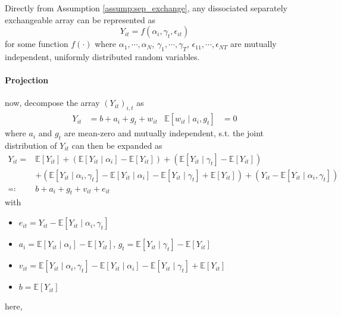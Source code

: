 \documentclass[twoside]{article}
\begin{document}
Directly from Assumption \ref{assump:sep_exchange}, any dissociated separately exchangeable array can be represented as 
\begin{equation*}
    Y_{it} = f\left(\alpha_i,\gamma_t,\epsilon_{it}\right)
\end{equation*}
for some function $f(\cdot)$ where $\alpha_1,\cdots,\alpha_N$, $\gamma_1,\cdots,\gamma_T$, $\epsilon_{11},\cdots,\epsilon_{NT}$ are mutually independent, uniformly distributed random variables.

\paragraph*{Projection} now, decompose the array $\left(Y_{it}\right)_{i,t}$ as 
\begin{align*}
    Y_{it} &= b + a_i + g_t + w_{it} & \mathbb{E}\left[w_{it}\mid a_i,g_t\right]&=0
\end{align*}
where $a_i$ and $g_t$ are mean-zero and mutually independent, s.t. the joint distribution of $Y_{it}$ can then be expanded as 
\begin{align*}
    Y_{it} =& \mathbb{E}\left[Y_{it}\right] + \left(\mathbb{E}\left[Y_{it}\mid \alpha_i\right] - \mathbb{E}\left[Y_{it}\right] \right) + \left( \mathbb{E}\left[Y_{it}\mid \gamma_t\right] - \mathbb{E}\left[Y_{it}\right] \right) \\
    &+ \left( \mathbb{E}\left[Y_{it}\mid \alpha_i,\gamma_t\right] - \mathbb{E}\left[Y_{it}\mid \alpha_i\right] - \mathbb{E}\left[Y_{it}\mid \gamma_t\right] + \mathbb{E}\left[Y_{it}\right]\right) + \left( Y_{it}-\mathbb{E}\left[Y_{it}\mid \alpha_i,\gamma_t\right] \right) \\
    \eqcolon & b+ a_i + g_t + v_{it} + e_{it}
\end{align*}
with
\begin{itemize}
    \item $e_{it} = Y_{it} - \mathbb{E}\left[Y_{it}\mid \alpha_i,\gamma_t\right]$
    \item $a_i = \mathbb{E}\left[Y_{it}\mid\alpha_i \right]-\mathbb{E}\left[Y_{it}\right]$, $g_t= \mathbb{E}\left[Y_{it}\mid \gamma_t\right]-\mathbb{E}\left[Y_{it}\right]$
    \item $v_{it} = \mathbb{E}\left[Y_{it}\mid \alpha_i,\gamma_t\right] - \mathbb{E}\left[Y_{it}\mid \alpha_i\right] - \mathbb{E}\left[Y_{it}\mid \gamma_t\right] + \mathbb{E}\left[Y_{it}\right]$
    \item $b= \mathbb{E}\left[Y_{it}\right]$
\end{itemize}
here, 
\end{document}
